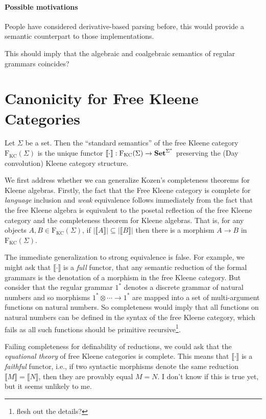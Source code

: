 \documentclass[acmsmall,anonymous,review,screen]{acmart}
\newcommand{\cat}[1]{
  \relax
  \StrLen{#1}[\arglength]
  \ifnum\arglength=1
  \mathcal{#1}
  \else
  \mathbf{#1}
  \fi
}
\newcommand{\FKC}{\textrm{F}_{\textrm{KC}}}
\newcommand{\sem}[1]{\llbracket{#1}\rrbracket}
\newcommand{\Set}{\cat{Set}}
\begin{document}
\paragraph{Possible motivations}

People have considered derivative-based parsing before, this would provide
a semantic counterpart to those implementations.

This should imply that the algebraic and coalgebraic semantics of regular grammars coincides?

\section{Canonicity for Free Kleene Categories}

Let $\Sigma$ be a set. Then the ``standard semantics'' of the free
Kleene category $\FKC(\Sigma)$ is the unique functor $\sem{\cdot} :
\FKC(\Sigma) \to \Set^{\Sigma^*}$ preserving the (Day convolution)
Kleene category structure.

We first address whether we can generalize Kozen's completeness
theorems for Kleene algebras. Firstly, the fact that the Free Kleene
category is complete for \emph{language} inclusion and \emph{weak}
equivalence follows immediately from the fact that the free Kleene
algebra is equivalent to the posetal reflection of the free Kleene
category and the completeness theorem for Kleene algebras. That is,
for any objects $A, B \in \FKC(\Sigma)$, if $|\sem{A}| \subseteq
|\sem{B}|$ then there is a morphism $A \to B$ in $\FKC(\Sigma)$.

The immediate generalization to strong equivalence is false. For
example, we might ask that $\sem{\cdot}$ is a \emph{full} functor,
that any semantic reduction of the formal grammars is the denotation
of a morphism in the free Kleene category. But consider that the
regular grammar $1^*$ denotes a discrete grammar of natural numbers
and so morphisms $1^* \otimes \cdots \to 1^*$ are mapped into a set of
multi-argument functions on natural numbers. So completeness would
imply that all functions on natural numbers can be defined in the
syntax of the free Kleene category, which fails as all such functions
should be primitive recursive\footnote{flesh out the
details?}.

Failing completeness for definability of reductions, we could ask that
the \emph{equational theory} of free Kleene categories is
complete. This means that $\sem{\cdot}$ is a \emph{faithful} functor,
i.e., if two syntactic morphisms denote the same reduction $\sem{M} =
\sem{N}$, then they are provably equal $M = N$. I don't know if this
is true yet, but it seems unlikely to me.
\end{document}
